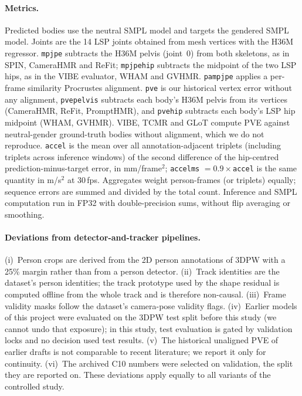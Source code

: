 \documentclass[10pt,onecolumn,letterpaper]{article}
\begin{document}
\paragraph{Metrics.}
Predicted bodies use the neutral SMPL model and targets the gendered SMPL model.
Joints are the 14 LSP joints obtained from mesh vertices with the H36M regressor.
\texttt{mpjpe} subtracts the H36M pelvis (joint~0) from both skeletons, as in SPIN, CameraHMR and ReFit; \texttt{mpjpehip} subtracts the midpoint of the two LSP hips, as in the VIBE evaluator, WHAM and GVHMR.
\texttt{pampjpe} applies a per-frame similarity Procrustes alignment.
\texttt{pve} is our historical vertex error without any alignment, \texttt{pvepelvis} subtracts each body's H36M pelvis from its vertices (CameraHMR, ReFit, PromptHMR), and \texttt{pvehip} subtracts each body's LSP hip midpoint (WHAM, GVHMR).
VIBE, TCMR and GLoT compute PVE against neutral-gender ground-truth bodies without alignment, which we do not reproduce.
\texttt{accel} is the mean over all annotation-adjacent triplets (including triplets across inference windows) of the second difference of the hip-centred prediction-minus-target error, in mm/frame$^2$; \texttt{accelms} $=0.9\times$\texttt{accel} is the same quantity in m/s$^2$ at 30\,fps.
Aggregates weight person-frames (or triplets) equally; sequence errors are summed and divided by the total count.
Inference and SMPL computation run in FP32 with double-precision sums, without flip averaging or smoothing.

\paragraph{Deviations from detector-and-tracker pipelines.}
(i)~Person crops are derived from the 2D person annotations of 3DPW with a 25\% margin rather than from a person detector.
(ii)~Track identities are the dataset's person identities; the track prototype used by the shape residual is computed offline from the whole track and is therefore non-causal.
(iii)~Frame validity masks follow the dataset's camera-pose validity flags.
(iv)~Earlier models of this project were evaluated on the 3DPW test split before this study (we cannot undo that exposure); in this study, test evaluation is gated by validation locks and no decision used test results.
(v)~The historical unaligned PVE of earlier drafts is not comparable to recent literature; we report it only for continuity.
(vi)~The archived C10 numbers were selected on validation, the split they are reported on.
These deviations apply equally to all variants of the controlled study.
\end{document}
